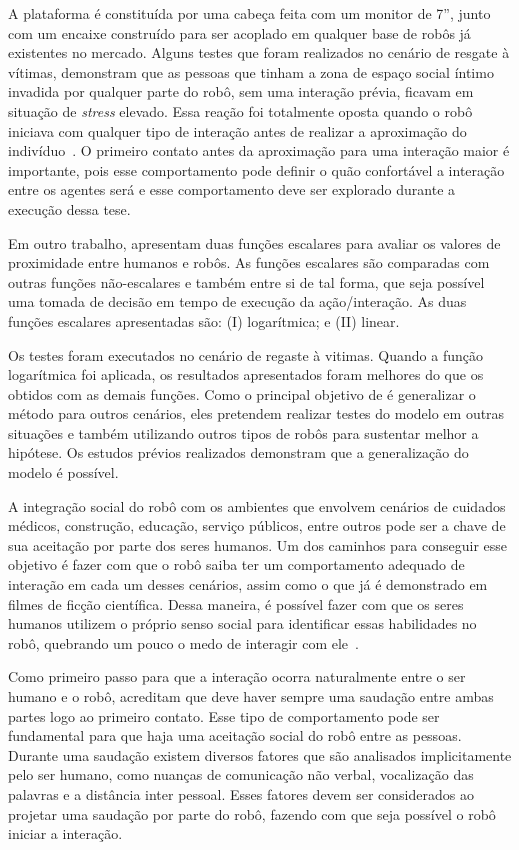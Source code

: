 A plataforma é constituída por uma cabeça feita com um monitor de 7'', junto com um encaixe construído para ser acoplado em qualquer base de robôs já existentes no mercado. Alguns testes que foram realizados no cenário de resgate à vítimas, demonstram que as pessoas que tinham a zona de espaço social íntimo invadida por qualquer parte do robô, sem uma interação prévia, ficavam em situação de \emph{stress} elevado. Essa reação foi totalmente oposta quando o robô iniciava com qualquer tipo de interação antes de realizar a aproximação do indivíduo~\cite{henkel:2012}. O primeiro contato antes da aproximação para uma interação maior é importante, pois esse comportamento pode definir o quão confortável a interação entre os agentes será e esse comportamento deve ser explorado durante a execução dessa tese.

Em outro trabalho,  apresentam duas funções escalares para avaliar os valores de proximidade entre humanos e robôs. As funções escalares são comparadas com outras funções não-escalares e também entre si de tal forma, que seja possível uma tomada de decisão em tempo de execução da ação/interação. As duas funções escalares apresentadas são: (I) logarítmica; e (II) linear.

Os testes foram executados no cenário de regaste à vitimas. Quando a função logarítmica foi aplicada, os resultados apresentados foram melhores do que os obtidos com as demais funções. Como o principal objetivo de  é generalizar o método para outros cenários, eles pretendem realizar testes do modelo em outras situações e também utilizando outros tipos de robôs para sustentar melhor a hipótese. Os estudos prévios realizados demonstram que a generalização do modelo é possível.

A integração social do robô com os ambientes que envolvem cenários de cuidados médicos, construção, educação, serviço públicos, entre outros pode ser a chave de sua aceitação por parte dos seres humanos. Um dos caminhos para conseguir esse objetivo é fazer com que o robô saiba ter um comportamento adequado de interação em cada um desses cenários, assim como o que já é demonstrado em filmes de ficção científica. Dessa maneira, é possível fazer com que os seres humanos utilizem o próprio senso social para identificar essas habilidades no robô, quebrando um pouco o medo de interagir com ele~\cite{heenan:2014}.

Como primeiro passo para que a interação ocorra naturalmente entre o ser humano e o robô,  acreditam que deve haver sempre uma saudação entre ambas partes logo ao primeiro contato. Esse tipo de comportamento pode ser fundamental para que haja uma aceitação social do robô entre as pessoas. Durante uma saudação existem diversos fatores que são analisados implicitamente pelo ser humano, como nuanças de comunicação não verbal, vocalização das palavras e a distância inter pessoal. Esses fatores devem ser considerados ao projetar uma saudação por parte do robô, fazendo com que seja possível o robô iniciar a interação.

